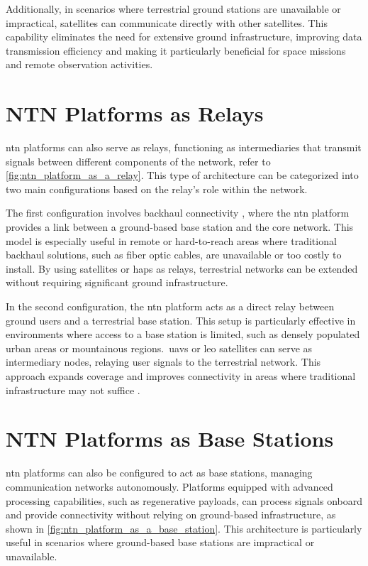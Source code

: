 Additionally, in scenarios where terrestrial ground stations are unavailable or impractical, satellites can communicate directly with other satellites. This capability eliminates the need for extensive ground infrastructure, improving data transmission efficiency and making it particularly beneficial for space missions and remote observation activities.

\section{NTN Platforms as Relays}\label{sec:ntn_platform_as_a_relay}

\gls{ntn} platforms can also serve as relays, functioning as intermediaries that transmit signals between different components of the network, refer to \cref{fig:ntn_platform_as_a_relay}. This type of architecture can be categorized into two main configurations based on the relay's role within the network.

The first configuration involves backhaul connectivity \autocite{Elamassie2023FreeSO}, where the \gls{ntn} platform provides a link between a ground-based base station and the core network. This model is especially useful in remote or hard-to-reach areas where traditional backhaul solutions, such as fiber optic cables, are unavailable or too costly to install. By using satellites or \glspl{hap} as relays, terrestrial networks can be extended without requiring significant ground infrastructure.

In the second configuration, the \gls{ntn} platform acts as a direct relay between ground users and a terrestrial base station. This setup is particularly effective in environments where access to a base station is limited, such as densely populated urban areas or mountainous regions.\ \glspl{uav} or \gls{leo} satellites can serve as intermediary nodes, relaying user signals to the terrestrial network. This approach expands coverage and improves connectivity in areas where traditional infrastructure may not suffice \autocite{overview_on-5g-and-beyon-networks-with-uav}.

\section{NTN Platforms as Base Stations}\label{sec:ntn_platform_as_a_base_station}

\gls{ntn} platforms can also be configured to act as base stations, managing communication networks autonomously. Platforms equipped with advanced processing capabilities, such as regenerative payloads, can process signals onboard and provide connectivity without relying on ground-based infrastructure, as shown in \cref{fig:ntn_platform_as_a_base_station}. This architecture is particularly useful in scenarios where ground-based base stations are impractical or unavailable.

